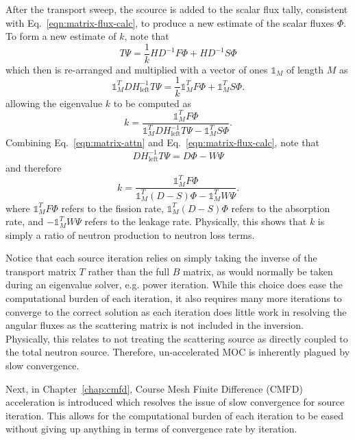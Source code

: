 After the transport sweep, the scource is added to the scalar flux tally, consistent with Eq.~\ref{eqn:matrix-flux-calc}, to produce a new estimate of the scalar fluxes $\Phi$. To form a new estimate of $k$, note that
\begin{equation}
T \Psi = \frac{1}{k} H D^{-1} F \Phi + H D^{-1} S \Phi
\end{equation}
which then is re-arranged and multiplied with a vector of ones $\mathbb{1}_M$ of length $M$ as
\begin{equation}
\mathbb{1}_M^T D H_{\text{left}}^{-1} T \Psi  = \frac{1}{k} \mathbb{1}_M^T  F \Phi + \mathbb{1}_M^T  S \Phi.
\end{equation}
allowing the eigenvalue $k$ to be computed as
\begin{equation}
k = \frac{\mathbb{1}_M^T F \Phi}{\mathbb{1}_M^T  D H_{\text{left}}^{-1} T \Psi - \mathbb{1}_M^T S \Phi}.
\end{equation}
Combining Eq.~\ref{eqn:matrix-attn} and Eq.~\ref{eqn:matrix-flux-calc}, note that
\begin{equation}
D H_{\text{left}}^{-1} T \Psi = D \Phi - W \Psi
\end{equation}
and therefore
\begin{equation}
k = \frac{\mathbb{1}_M^T F \Phi}{\mathbb{1}_M^T \left(D - S \right) \Phi - \mathbb{1}_M^T W \Psi}.
\end{equation}
where $\mathbb{1}_M^T F \Phi$ refers to the fission rate, $\mathbb{1}_M^T \left(D - S \right) \Phi$ refers to the absorption rate, and $-\mathbb{1}_M^T W \Psi$ refers to the leakage rate. Physically, this shows that $k$ is simply a ratio of neutron production to neutron loss terms.

Notice that each source iteration relies on simply taking the inverse of the transport matrix $T$ rather than the full $B$ matrix, as would normally be taken during an eigenvalue solver, e.g. power iteration. While this choice does ease the computational burden of each iteration, it also requires many more iterations to converge to the correct solution as each iteration does little work in resolving the angular fluxes as the scattering matrix is not included in the inversion. Physically, this relates to not treating the scattering source as directly coupled to the total neutron source. Therefore, un-accelerated MOC is inherently plagued by slow convergence. 

Next, in Chapter~\ref{chap:cmfd}, Course Mesh Finite Difference (CMFD) acceleration is introduced which resolves the issue of slow convergence for source iteration. This allows for the computational burden of each iteration to be eased without giving up anything in terms of convergence rate by iteration.